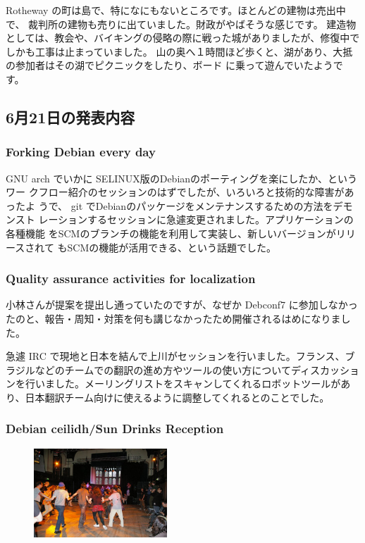 \documentclass[mingoth,a4paper]{jsarticle}
\begin{document}
Rotheway の町は島で、特になにもないところです。ほとんどの建物は売出中で、
裁判所の建物も売りに出ていました。財政がやばそうな感じです。
建造物としては、教会や、バイキングの侵略の際に戦った城がありましたが、修復中でしかも工事は止まっていました。
山の奥へ１時間ほど歩くと、湖があり、大抵の参加者はその湖でピクニックをしたり、ボード
に乗って遊んでいたようです。

\subsection{6月21日の発表内容}
\subsubsection{Forking Debian every day}

GNU arch でいかに SELINUX版のDebianのポーティングを楽にしたか、というワー
クフロー紹介のセッションのはずでしたが、いろいろと技術的な障害があったよ
うで、 git でDebianのパッケージをメンテナンスするための方法をデモンスト
レーションするセッションに急遽変更されました。アプリケーションの各種機能
をSCMのブランチの機能を利用して実装し、新しいバージョンがリリースされて
もSCMの機能が活用できる、という話題でした。

\subsubsection{Quality assurance activities for localization}

小林さんが提案を提出し通っていたのですが、なぜか Debconf7 に参加しなかっ
たのと、報告・周知・対策を何も講じなかったため開催されるはめになりました。

急遽 IRC で現地と日本を結んで上川がセッションを行いました。フランス、ブ
ラジルなどのチームでの翻訳の進め方やツールの使い方についてディスカッショ
ンを行いました。メーリングリストをスキャンしてくれるロボットツールがあ
り、日本翻訳チーム向けに使えるように調整してくれるとのことでした。

\subsubsection{Debian ceilidh/Sun Drinks Reception}
\begin{figure}\includegraphics[width=5cm]{image200706/debconf7-dance.jpg}\end{figure}
\end{document}
